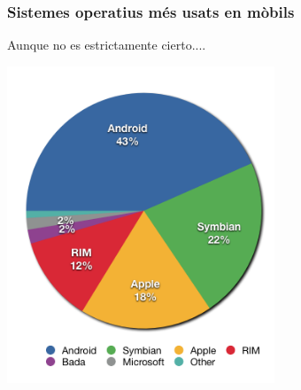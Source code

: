 \documentclass[colorlinks,10pt]{beamer}
\begin{document}
\begin{frame}
  \frametitle{Sistemes operatius més usats en mòbils}
  Aunque no es estrictamente cierto....
  \pause \begin{center}
    \includegraphics[width=0.6\textwidth]{figs/Smartphone_share_current} \\
  \end{center}
\end{frame}
\end{document}
